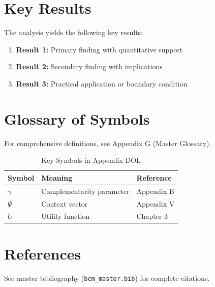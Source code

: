 

\section{Key Results}
\label{sec:dol-results}

The analysis yields the following key results:

\begin{enumerate}
    \item \textbf{Result 1:} Primary finding with quantitative support
    \item \textbf{Result 2:} Secondary finding with implications
    \item \textbf{Result 3:} Practical application or boundary condition
\end{enumerate}

\section{Glossary of Symbols}
\label{sec:dol-glossary}

For comprehensive definitions, see Appendix G (Master Glossary).

\begin{table}[htbp]
\centering
\caption{Key Symbols in Appendix DOL}
\begin{tabular}{lll}
\toprule
\textbf{Symbol} & \textbf{Meaning} & \textbf{Reference} \\
\midrule
$\gamma$ & Complementarity parameter & Appendix B \\
$\Psi$ & Context vector & Appendix V \\
$U$ & Utility function & Chapter 3 \\
\bottomrule
\end{tabular}
\end{table}


\section{References}
\label{sec:dol-references}

See master bibliography (\texttt{bcm\_master.bib}) for complete citations.

\nocite{bcm_master}

